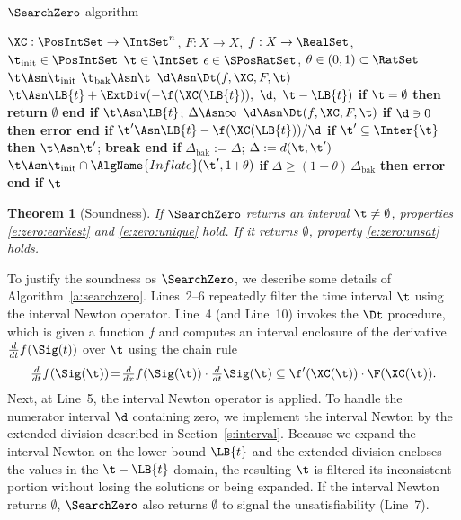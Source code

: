 \documentclass[paper]{ieice}
\newtheorem{theorem}{Theorem}
\begin{document}
\begin{algorithm}[t]
\caption{\label{a:searchzero} $\SearchZero$ algorithm}

\begin{algorithmic}[1]
  \REQUIRE $\XC : \PosIntSet\to\IntSet^n$, 
     $F : X \to X$, 
$f : X \to \RealSet$, 
	 $\t_\mathrm{init} \in \PosIntSet$
	 \ENSURE $\t\in\IntSet$ \PARAM $\epsilon \in \SPosRatSet$, $\theta \in (0,1) \subset \RatSet$\STATE $\t \Asn \t_\mathrm{init}$ 
    \STATE $\t_\mathrm{bak} \Asn \t$
\STATE $\d \Asn \Dt(f, \XC, F, \t)$
	\STATE $\t \Asn \LB{t}+\ExtDiv(-\f(\XC(\LB{t})),\ \d,\ \t-\LB{t})$
  \STATE \textbf{if} $\t = \emptyset$ \textbf{then return} $\emptyset$ \textbf{end if}
\vspace{.5em}
  \STATE $\t \Asn \LB{t}$; \quad $\Delta \Asn \infty$
	\STATE $\d \Asn \Dt(f, \XC, F, \t)$
    \STATE \textbf{if} $\d \ni 0$ \textbf{then error end if}
    \STATE $\t' \Asn \LB{t}-{\f(\XC(\LB{t}))}/{\d}$
	\STATE \textbf{if} $\t' \subseteq \Inter{\t}$
	  \textbf{then} $\t \Asn \t'$; \textbf{break end if}
\STATE $\Delta_\mathrm{bak} := \Delta$; \quad $\Delta := d(\t,\t')$
	\STATE $\t \Asn \t_\mathrm{init} \cap \AlgName{Inflate}(\t',1\!+\!\theta)$
	\STATE \textbf{if} $\Delta \geq (1\!-\!\theta)\, \Delta_\mathrm{bak}$ \textbf{then error end if}
  \ENDLOOP
\vspace{.5em}
\RETURN $\t$
\end{algorithmic}
\end{algorithm}

\begin{theorem}[Soundness]
	If $\SearchZero$ returns an interval $\t \neq \emptyset$, properties \eqref{e:zero:earliest} and \eqref{e:zero:unique} hold.
	If it returns $\emptyset$, property \eqref{e:zero:unsat} holds.
\end{theorem}

To justify the soundness os $\SearchZero$, we describe some details of Algorithm~\ref{a:searchzero}. 
Lines~2--6 repeatedly filter the time interval $\t$ using the interval Newton operator.
Line~4 (and Line~10) invokes the $\Dt$ procedure, which is given a function $f$ and computes an interval enclosure of the derivative $\frac{d}{dt}f(\Sig(t))$ over $\t$ using the chain rule
\[
	\tfrac{d}{dt}f(\Sig(\t)) \!=\! \tfrac{d}{dx}f(\Sig(\t)) \cdot \tfrac{d}{dt}\Sig(\t)
	\subseteq \f'(\XC(\t)) \cdot \F(\XC(\t)).
\]
Next, at Line~5, the interval Newton operator is applied.
To handle the numerator interval $\d$ containing zero, we implement the interval Newton by the extended division described in Section~\ref{s:interval}.
Because we expand the interval Newton on the lower bound $\LB{t}$ and the extended division encloses the values in the $\t-\LB{t}$ domain, the resulting $\t$ is filtered its inconsistent portion without losing the solutions or being expanded.
If the interval Newton returns $\emptyset$, $\SearchZero$ also returns $\emptyset$ to signal the unsatisfiability (Line~7).
\end{document}
